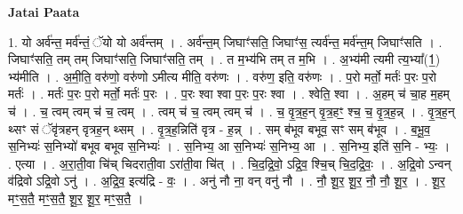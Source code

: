 \documentclass[17pt]{extarticle}
\begin{document}
\textbf{Jatai Paata} \newline

1. यो अर्व॑न्त॒ मर्व॑न्तं॒ ॅयो यो अर्व॑न्तम् । . अर्व॑न्त॒म् जिघाꣳ॑सति॒ जिघाꣳ॑स॒ त्यर्व॑न्त॒ मर्व॑न्त॒म् जिघाꣳ॑सति । . जिघाꣳ॑सति॒ तम् तम् जिघाꣳ॑सति॒ जिघाꣳ॑सति॒ तम् । . त म॒भ्य॑भि तम् त म॒भि । . अ॒भ्य॑मी त्यमी त्य॒भ्या᳚(1॒) भ्य॑मीति । . अ॒मी॒ति॒ वरु॑णो॒ वरु॑णो ऽमीत्य मीति॒ वरु॑णः । . वरु॑ण॒ इति॒ वरु॑णः । . प॒रो मर्तो॒ मर्तः॑ प॒रः प॒रो मर्तः॑ । . मर्तः॑ प॒रः प॒रो मर्तो॒ मर्तः॑ प॒रः । . प॒रः श्वा श्वा प॒रः प॒रः श्वा । . श्वेति॒ श्वा । . अ॒हम् च॑ चा॒ह म॒हम् च॑ । . च॒ त्वम् त्वम् च॑ च॒ त्वम् । . त्वम् च॑ च॒ त्वम् त्वम् च॑ । . च॒ वृ॒त्र॒ह॒न् वृ॒त्र॒हꣳ॒॒ श्च॒ च॒ वृ॒त्र॒ह॒न्न् । . वृ॒त्र॒ह॒न् थ्सꣳ सं ॅवृ॑त्रहन् वृत्रह॒न् थ्सम् । . वृ॒त्र॒ह॒न्निति॑ वृत्र - ह॒न्न् । . सम् ब॑भूव बभूव॒ सꣳ सम् ब॑भूव । . ब॒भू॒व॒ स॒निभ्यः॑ स॒निभ्यो॑ बभूव बभूव स॒निभ्यः॑ । . स॒निभ्य॒ आ स॒निभ्यः॑ स॒निभ्य॒ आ । . स॒निभ्य॒ इति॑ स॒नि - भ्यः॒ । . एत्या । . अ॒रा॒ती॒वा चि॑च् चिदराती॒वा ऽरा॑ती॒वा चि॑त् । . चि॒द॒द्रि॒वो॒ ऽद्रि॒व॒ श्चि॒च् चि॒द॒द्रि॒वः॒ । . अ॒द्रि॒वो ऽन्वन् व॑द्रिवो ऽद्रि॒वो ऽनु॑ । . अ॒द्रि॒व॒ इत्य॑द्रि - वः॒ । . अनु॑ नौ ना॒ वन् वनु॑ नौ । . नौ॒ शू॒र॒ शू॒र॒ नौ॒ नौ॒ शू॒र॒ । . शू॒र॒ मꣳ॒॒स॒तै॒ मꣳ॒॒स॒तै॒ शू॒र॒ शू॒र॒ मꣳ॒॒स॒तै॒ । \newline
\end{document}
